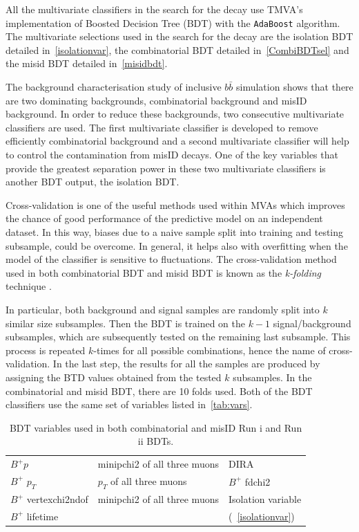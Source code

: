 All the multivariate classifiers in the search for the \Bmumumu decay use TMVA's \cite{Speckmayer:2010zz} implementation of Boosted Decision Tree (BDT) with the \texttt{AdaBoost} algorithm. The multivariate selections used in the search for the \Bmumumu decay are the isolation BDT detailed in~\autoref{isolationvar}, the combinatorial BDT detailed in~\autoref{CombiBDTsel} and the misid BDT detailed in~\autoref{misidbdt}.

The background characterisation study of inclusive $b\bar{b}$ simulation shows that there are two dominating backgrounds, combinatorial background and misID background. In order to reduce these backgrounds, two consecutive multivariate classifiers are used. The first multivariate classifier is developed to remove efficiently combinatorial background and a second multivariate classifier will help to control the contamination from misID decays. One of the key variables that provide the greatest separation power in these two multivariate classifiers is another BDT output, the isolation BDT.

Cross-validation is one of the useful methods used within MVAs which improves the chance of good performance of the predictive model on an independent dataset. In this way, biases due to a naive sample split into training and testing subsample, could be overcome. In general, it helps also with overfitting when the model of the classifier is sensitive to fluctuations.  The cross-validation method used in both combinatorial BDT and misid BDT is known as the \textit{k-folding} technique \cite{kfold}. 

In particular, both background and signal samples are randomly split into $k$ similar size subsamples. Then the BDT is trained on the $k-1$ signal/background subsamples, which are subsequently tested on the remaining last subsample. This process is repeated $k$-times for all possible combinations, hence the name of cross-validation. In the last step, the results for all the samples are produced by assigning the BTD values obtained from the tested $k$ subsamples. In the combinatorial and misid BDT, there are 10 folds used. Both of the BDT classifiers use the same set of variables listed in~\autoref{tab:vars}.

\begin{table}[h!]
\begin{center}
\begin{tabular}{| l  l  l |} \hline
$B^{+} p$ & \gls{minipchi2} of all three muons & \gls{DIRA} \\
$B^{+}$ $p_T$ & $p_{T}$ of all three muons & $B^{+}$ \gls{fdchi2} \\ 
$B^{+}$ \gls{vertexchi2ndof} & \gls{minipchi2} of all three muons  & Isolation variable \\
	$B^{+}$ lifetime &  & (~\autoref{isolationvar}) \\ \hline
\end{tabular}
\end{center}
\caption{BDT variables used in both combinatorial and misID Run \Rn{1} and Run \Rn{2} BDTs.}
\label{tab:vars}
\end{table}



